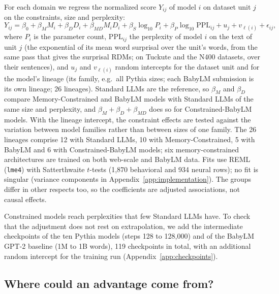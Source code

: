 For each domain we regress the normalized score $Y_{ij}$ of model $i$ on dataset unit $j$ on the constraints, size and perplexity:
\begin{equation}
Y_{ij}=\beta_0+\beta_M M_i+\beta_D D_i+\beta_{MD}M_iD_i+\beta_S\log_{10}P_i+\beta_P\log_{10}\mathrm{PPL}_{ij}+u_j+v_{\ell(i)}+\epsilon_{ij},
\label{eq:group}
\end{equation}
where $P_i$ is the parameter count, $\mathrm{PPL}_{ij}$ the perplexity of model $i$ on the text of unit $j$ (the exponential of its mean word surprisal over the unit's words, from the same pass that gives the surprisal RDMs; on Tuckute and the N400 datasets, over their sentences), and $u_j$ and $v_{\ell(i)}$ random intercepts for the dataset unit and for the model's lineage (its family, e.g.\ all Pythia sizes; each BabyLM submission is its own lineage; 26 lineages). Standard LLMs are the reference, so $\beta_M$ and $\beta_D$ compare Memory-Constrained and BabyLM models with Standard LLMs of the same size and perplexity, and $\beta_M+\beta_D+\beta_{MD}$ does so for Constrained-BabyLM models. With the lineage intercept, the constraint effects are tested against the variation between model families rather than between sizes of one family. The 26 lineages comprise 12 with Standard LLMs, 10 with Memory-Constrained, 5 with BabyLM and 6 with Constrained-BabyLM models; six memory-constrained architectures are trained on both web-scale and BabyLM data. Fits use REML (\texttt{lme4}) with Satterthwaite $t$-tests (1,870 behavioral and 934 neural rows); no fit is singular (variance components in Appendix~\ref{app:implementation}). The groups differ in other respects too, so the coefficients are adjusted associations, not causal effects.

Constrained models reach perplexities that few Standard LLMs have. To check that the adjustment does not rest on extrapolation, we add the intermediate checkpoints of the ten Pythia models (steps 128 to 128{,}000) and of the BabyLM GPT-2 baseline (1M to 1B words), 119 checkpoints in total, with an additional random intercept for the training run (Appendix~\ref{app:checkpoints}).

\subsection{Where could an advantage come from?}
\label{sec:design-dlt}

